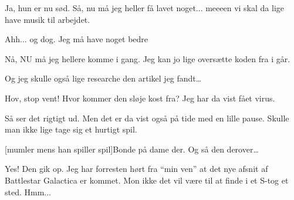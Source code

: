 \documentclass[a4paper,11pt]{article}
\begin{document}
\begin{sketch}
   Ja, hun er nu sød. Så, nu må jeg heller få lavet noget...
  meeeen vi skal da lige have musik til arbejdet.
                                                                                
                                                                                
   Ahh... og dog. Jeg må have noget bedre 
                                                                                
                                                                                
   Nå, NU må jeg hellere komme i gang. Jeg kan jo lige
  oversætte koden fra i går.
                                                                                

 Og jeg skulle også lige researche den artikel jeg fandt\ldots


 Hov, stop vent! Hvor kommer den sløje kost fra? Jeg har da
vist fået virus. 


 Så ser det rigtigt ud. Men det er da vist også på tide med en
lille pause. Skulle man ikke lige tage sig et hurtigt spil.


[mumler mens han spiller spil]Bonde på dame der. Og så den
derover\ldots

 Yes! Den gik op. Jeg har forresten hørt fra ``min ven'' at
det nye afsnit af Battlestar Galactica er kommet. Mon ikke det vil
være til at finde i et S-tog et sted. Hmm...

                                                                             
\end{sketch}
\end{document}

